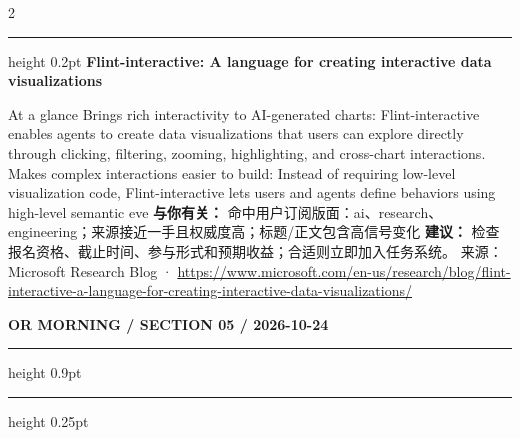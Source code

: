 \documentclass[10.5pt]{ctexart}
\begin{document}
\begin{multicols}{2}
\vspace{2mm}
\hrule height 0.2pt
\vspace{2mm}
{\large\bfseries Flint-interactive: A language for creating interactive data visualizations}\par
At a glance Brings rich interactivity to AI-generated charts: Flint-interactive enables agents to create data visualizations that users can explore directly through clicking, filtering, zooming, highlighting, and cross-chart interactions. Makes complex interactions easier to build: Instead of requiring low-level visualization code, Flint-interactive lets users and agents define behaviors using high-level semantic eve
\textbf{与你有关：} 命中用户订阅版面：ai、research、engineering；来源接近一手且权威度高；标题/正文包含高信号变化
\textbf{建议：} 检查报名资格、截止时间、参与形式和预期收益；合适则立即加入任务系统。
{\footnotesize\color{ormuted} 来源：Microsoft Research Blog · \url{https://www.microsoft.com/en-us/research/blog/flint-interactive-a-language-for-creating-interactive-data-visualizations/}}
\end{multicols}
\newpage
{\small\bfseries OR MORNING / SECTION 05 / 2026-10-24}
\vspace{2mm}
\hrule height 0.9pt
\vspace{1.5mm}
\hrule height 0.25pt
\vspace{4mm}
\end{document}
